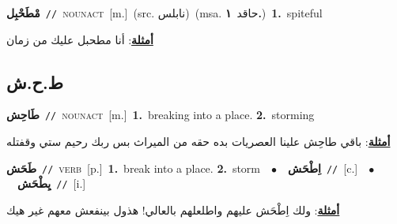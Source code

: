 \documentclass[10pt,a4paper,twoside]{article} %
\begin{document}
\begin{multicols}{2}
{\setlength\topsep{0pt}\textbf{\foreignlanguage{arabic}{مْطَحْبِل}}\ {\color{gray}\texttt{//}\color{black}}\ \textsc{noun\textunderscore act}\ [m.]\ (src. \color{gray}\foreignlanguage{arabic}{نابلس}\color{black})\ \color{gray}(msa. \foreignlanguage{arabic}{حاقد}~\foreignlanguage{arabic}{\textbf{١.}})\color{black}\ \textbf{1.}~spiteful\  \begin{flushright}\color{gray}\foreignlanguage{arabic}{\textbf{\underline{\foreignlanguage{arabic}{أمثلة}}}: أنا مطحبل عليك من زمان}\end{flushright}\color{black}} \vspace{2mm}

\vspace{-3mm}
\subsection*{\color{blue}\foreignlanguage{arabic}{ط.ح.ش}\color{blue}{}} 

{\setlength\topsep{0pt}\textbf{\foreignlanguage{arabic}{طَاحِش}}\ {\color{gray}\texttt{//}\color{black}}\ \textsc{noun\textunderscore act}\ [m.]\ \textbf{1.}~breaking into a place.  \textbf{2.}~storming\  \begin{flushright}\color{gray}\foreignlanguage{arabic}{\textbf{\underline{\foreignlanguage{arabic}{أمثلة}}}: باقي طاحِش علينا العصريات بده حقه من الميراث بس ربك رحيم ستي وقفتله}\end{flushright}\color{black}} \vspace{2mm}

{\setlength\topsep{0pt}\textbf{\foreignlanguage{arabic}{طَحَش}}\ {\color{gray}\texttt{//}\color{black}}\ \textsc{verb}\ [p.]\ \textbf{1.}~break into a place.  \textbf{2.}~storm\ \ $\bullet$\ \ \setlength\topsep{0pt}\textbf{\foreignlanguage{arabic}{اِطْحَش}}\ {\color{gray}\texttt{//}\color{black}}\ [c.]\ \ $\bullet$\ \ \setlength\topsep{0pt}\textbf{\foreignlanguage{arabic}{يِطْحَش}}\ {\color{gray}\texttt{//}\color{black}}\ [i.]\  \begin{flushright}\color{gray}\foreignlanguage{arabic}{\textbf{\underline{\foreignlanguage{arabic}{أمثلة}}}: ولك اِطْحَش عليهم واطلعلهم بالعالي! هذول بينفعش معهم غير هيك}\end{flushright}\color{black}} \vspace{2mm}


\end{multicols}
\end{document}
